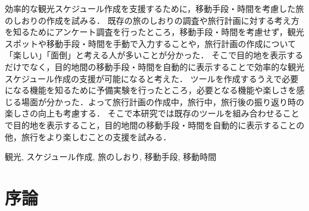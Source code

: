 \documentclass{funthesis}
\begin{document}
\begin{jabstract}

効率的な観光スケジュール作成を支援するために，移動手段・時間を考慮した旅のしおりの作成を試みる．
既存の旅のしおりの調査や旅行計画に対する考え方を知るためにアンケート調査を行ったところ，移動手段・時間を考慮せず，観光スポットや移動手段・時間を手動で入力することや，旅行計画の作成について「楽しい」「面倒」と考える人が多いことが分かった．
そこで目的地を表示するだけでなく，目的地間の移動手段・時間を自動的に表示することで効率的な観光スケジュール作成の支援が可能になると考えた．
ツールを作成するうえで必要になる機能を知るために予備実験を行ったところ，必要となる機能や楽しさを感じる場面が分かった．よって旅行計画の作成中，旅行中，旅行後の振り返り時の楽しさの向上も考慮する．
そこで本研究では既存のツールを組み合わせることで目的地を表示すること，目的地間の移動手段・時間を自動的に表示することの他，旅行をより楽しむことの支援を試みる．


\end{jabstract}

\begin{jkeyword}
観光, スケジュール作成, 旅のしおり, 移動手段, 移動時間
\end{jkeyword}

\tableofcontents %


\chapter{序論} %
\end{document}
